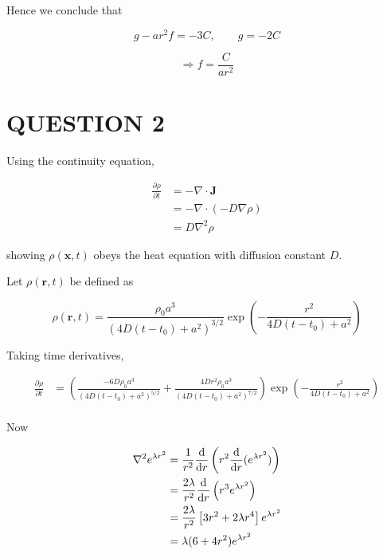 \documentclass[a4paper]{article}
\begin{document}
Hence we conclude that

\[ g - a r^{2} f = - 3 C , \qquad g = -2C \]

\[ \Rightarrow f = \frac{C}{ar^{2}} \]

\section{QUESTION 2}

Using the continuity equation, 

\begin{align*}
\frac{\partial \rho }{\partial t} & = - \nabla \cdot \mathbf{J}  \\
& = - \nabla \cdot (-D \nabla  \rho) \\
& = D \nabla^{2} \rho 
\end{align*}

showing $ \rho(\mathbf{x},t) $ obeys the heat equation with diffusion constant $ D $.

Let $ \rho(\mathbf{r},t) $ be defined as 

\[ \rho(\mathbf{r},t) = \frac{\rho_{0}a^{3}}{	(4D(t - t_{0}) + a^{2})^{3/2}} \exp \left(  - \frac{r^{2}}{4D(t - t_{0}) + a^{2}} \right)  \]

Taking time derivatives,

\begin{align*}
\frac{\partial \rho }{\partial t} & = \left(  \frac{-6D \rho_{0}a^{3}}{	(4D(t - t_{0}) + a^{2})^{5/2}} + \frac{4D r^{2} \rho_{0}a^{3} }{(4D(t-t_{0}) + a^{2})^{7/2}} \right) \exp \left( - \frac{r^{2}}{4D(t - t_{0}) + a^{2}} \right) \\
\end{align*}

Now


\begin{align*}
\nabla^{2} e^{\lambda r^{2}} & = \frac{1}{r^{2} }\frac{\mathrm{d} }{\mathrm{d} r} \left(  r^{2} \frac{\mathrm{d} }{\mathrm{d} r}( e^{\lambda r^{2}} ) \right) \\
& = \frac{2 \lambda}{r^{2}} \frac{\mathrm{d} }{\mathrm{d} r} \left(  r^{3} e^{\lambda r^{2}} \right) \\
& =  \frac{2 \lambda}{r^{2}} \left[   3r^{2} + 2 \lambda r^{4} \right] e^{\lambda r^{2}} \\
& = \lambda(6 + 4r^{2}) e^{\lambda r^{2}}
\end{align*}
\end{document}
